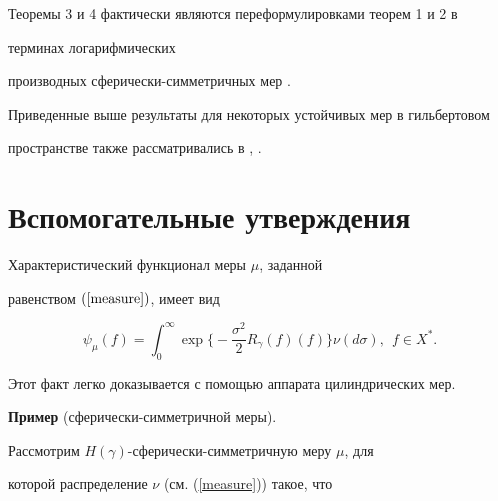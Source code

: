 \begin{notenonum}


Теоремы 3 и 4 фактически являются переформулировками теорем 1 и 2 в 


терминах логарифмических


производных сферически-симметричных мер \cite{Shats2}.


\end{notenonum}





Приведенные выше результаты для некоторых устойчивых мер в гильбертовом 


пространстве также рассматривались в \cite{Kn}, \cite{ShKn}.








\section{Вспомогательные утверждения}








\begin{lem}


Характеристический функционал меры $\mu$, заданной


равенством $(\ref{measure})$, имеет вид


\begin{equation}


\psi_{\mu}(f)=\int_0^\infty\exp


\bigg\{-\frac{\sigma^2}2R_\gamma(f)(f)\bigg\}\nu(d\sigma),\ \ f\in X^*.


\label{shenberg1}


\end{equation}


\end{lem}





Этот факт легко доказывается с помощью аппарата цилиндрических мер.





{\bf Пример} (сферически-симметричной меры).


Рассмотрим $H(\gamma)$-сферически-симметричную меру $\mu$, для 


которой распределение $\nu$ (см. (\ref{measure})) такое, что


